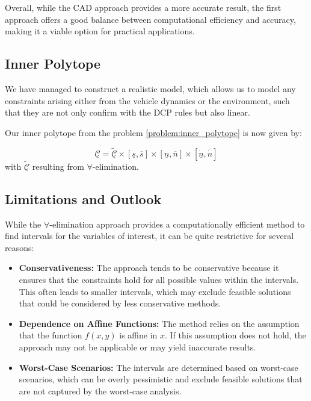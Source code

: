 Overall, while the CAD approach provides a more accurate result, the first approach offers a good balance between computational efficiency and
accuracy, making it a viable option for practical applications.

\subsection{Inner Polytope}

We have managed to construct a realistic model, which allows us to model any constraints arising either from the vehicle dynamics or the environment,
such that they are not only confirm with the DCP rules but also linear.

Our inner polytope from the problem \ref{problem:inner_polytope} is now given by:

\begin{equation}
	\underline{\mathcal{C}} = \tilde{\underline{\mathcal{C}}} \times [\underline{s}, \overline{s}] \times [\underline{n}, \overline{n}] \times [\underline{\dot{n}}, \overline{\dot{n}}]
\end{equation}
with $\tilde{\underline{\mathcal{C}}}$ resulting from $\forall$-elimination.

\subsection{Limitations and Outlook}

While the $\forall$-elimination approach provides a computationally efficient method to find intervals for the variables of interest, it can be quite restrictive for several reasons:

\begin{itemize}
	\item \textbf{Conservativeness:}
	      The approach tends to be conservative because it ensures that the constraints hold for all possible values within the intervals.
	      This often leads to smaller intervals, which may exclude feasible solutions that could be considered by less conservative methods.
	\item \textbf{Dependence on Affine Functions:}
	      The method relies on the assumption that the function $f(x, y)$ is affine in $x$.
	      If this assumption does not hold, the approach may not be applicable or may yield inaccurate results.
	\item \textbf{Worst-Case Scenarios:}
	      The intervals are determined based on worst-case scenarios, which can be overly pessimistic and exclude feasible solutions that are not captured by
	      the worst-case analysis.
\end{itemize}

